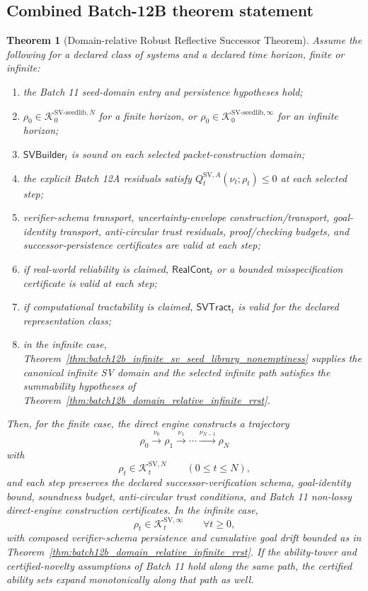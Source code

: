 \documentclass[11pt]{article}
\newtheorem{theorem}{Theorem}[section]
\newcommand{\1}{\mathbf{1}}
\providecommand{\Kcal}{\mathcal{K}}
\begin{document}
\subsection{Combined Batch-12B theorem statement}

\begin{theorem}[Domain-relative Robust Reflective Successor Theorem]
\label{thm:batch12b_combined_domain_relative_rrst}
Assume the following for a declared class of systems and a declared time horizon, finite or infinite:
\begin{enumerate}[label=(\roman*),leftmargin=1.5em]
    \item the Batch 11 seed-domain entry and persistence hypotheses hold;
    \item \(\rho_0\in\Kcal_0^{\mathrm{SV\mbox{-}seedlib},N}\) for a finite horizon, or \(\rho_0\in\Kcal_0^{\mathrm{SV\mbox{-}seedlib},\infty}\) for an infinite horizon;
    \item \(\mathsf{SVBuilder}_t\) is sound on each selected packet-construction domain;
    \item the explicit Batch 12A residuals satisfy \(Q_t^{\mathrm{SV},A}(\nu_t;\rho_t)\le0\) at each selected step;
    \item verifier-schema transport, uncertainty-envelope construction/transport, goal-identity transport, anti-circular trust residuals, proof/checking budgets, and successor-persistence certificates are valid at each step;
    \item if real-world reliability is claimed, \(\mathsf{RealCont}_t\) or a bounded misspecification certificate is valid at each step;
    \item if computational tractability is claimed, \(\mathsf{SVTract}_t\) is valid for the declared representation class;
    \item in the infinite case, Theorem~\ref{thm:batch12b_infinite_sv_seed_library_nonemptiness} supplies the canonical infinite SV domain and the selected infinite path satisfies the summability hypotheses of Theorem~\ref{thm:batch12b_domain_relative_infinite_rrst}.
\end{enumerate}
Then, for the finite case, the direct engine constructs a trajectory
\[
\rho_0\xrightarrow{\nu_0}\rho_1\xrightarrow{\nu_1}\cdots\xrightarrow{\nu_{N-1}}\rho_N
\]
with
\[
\rho_t\in\Kcal_t^{\mathrm{SV},N}\qquad(0\le t\le N),
\]
and each step preserves the declared successor-verification schema, goal-identity bound, soundness budget, anti-circular trust conditions, and Batch 11 non-lossy direct-engine construction certificates.  In the infinite case,
\[
\rho_t\in\Kcal_t^{\mathrm{SV},\infty}\qquad\forall t\ge0,
\]
with composed verifier-schema persistence and cumulative goal drift bounded as in Theorem~\ref{thm:batch12b_domain_relative_infinite_rrst}.  If the ability-tower and certified-novelty assumptions of Batch 11 hold along the same path, the certified ability sets expand monotonically along that path as well.
\end{theorem}
\end{document}

